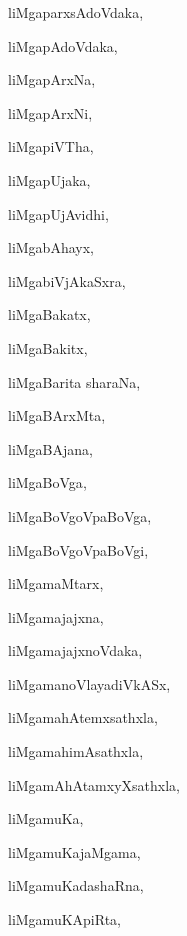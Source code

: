 \begin{multicols}{3}
{\noindent
{liMgaparxsAdoVdaka}, \pageref{liMgaparxsAdoVdaka}

\noindent
{liMgapAdoVdaka}, \pageref{liMgapAdoVdaka}

\noindent
{liMgapArxNa}, \pageref{liMgapArxNa}

\noindent
{liMgapArxNi}, \pageref{liMgapArxNi}

\noindent
{liMgapiVTha}, \pageref{liMgapiVTha}

\noindent
{liMgapUjaka}, \pageref{liMgapUjaka}

\noindent
{liMgapUjAvidhi}, \pageref{liMgapUjAvidhi}

\noindent
{liMgabAhayx}, \pageref{liMgabAhayx}

\noindent
{liMgabiVjAkaSxra}, \pageref{liMgabiVjAkaSxra}

\noindent
{liMgaBakatx}, \pageref{liMgaBakatx}

\noindent
{liMgaBakitx}, \pageref{liMgaBakitx}

\noindent
{liMgaBarita sharaNa}, \pageref{liMgaBaritasharaNa}

\noindent
{liMgaBArxMta}, \pageref{liMgaBArxMta}

\noindent
{liMgaBAjana}, \pageref{liMgaBAjana}

\noindent
{liMgaBoVga}, \pageref{liMgaBoVga}

\noindent
{liMgaBoVgoVpaBoVga}, \pageref{liMgaBoVgoVpaBoVga}

\noindent
{liMgaBoVgoVpaBoVgi}, \pageref{liMgaBoVgoVpaBoVgi}

\noindent
{liMgamaMtarx}, \pageref{liMgamaMtarx}

\noindent
{liMgamajajxna}, \pageref{liMgamajajxna}

\noindent
{liMgamajajxnoVdaka}, \pageref{liMgamajajxnoVdaka}

\noindent
{liMgamanoVlayadiVkASx}, \pageref{liMgamanoVlayadiVkASx}

\noindent
{liMgamahAtemxsathxla}, \pageref{liMgamahAtemxsathxla}

\noindent
{liMgamahimAsathxla}, \pageref{liMgamahimAsathxla}

\noindent
{liMgamAhAtamxyXsathxla}, \pageref{liMgamAhAtamxyXsathxla}

\noindent
{liMgamuKa}, \pageref{liMgamuKa}

\noindent
{liMgamuKajaMgama}, \pageref{liMgamuKajaMgama}

\noindent
{liMgamuKadashaRna}, \pageref{liMgamuKadashaRna}

\noindent
{liMgamuKApiRta}, \pageref{liMgamuKApiRta}

}
\end{multicols}
